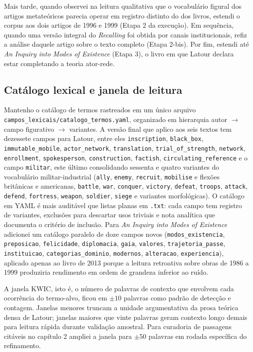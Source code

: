 Mais tarde, quando observei na leitura qualitativa que o vocabulário figural dos artigos metateóricos parecia operar em registro distinto do dos livros, estendi o corpus aos dois artigos de 1996 e 1999 (Etapa 2 da execução). Em sequência, quando uma versão integral do \emph{Recalling} foi obtida por canais institucionais, refiz a análise daquele artigo sobre o texto completo (Etapa 2-bis). Por fim, estendi até \emph{An Inquiry into Modes of Existence} (Etapa 3), o livro em que Latour declara estar completando a teoria ator-rede.

\subsection{Catálogo lexical e janela de leitura}

Mantenho o catálogo de termos rastreados em um único arquivo \texttt{campos\_lexicais/catalogo\_termos.yaml}, organizado em hierarquia autor $\to$ campo figurativo $\to$ variantes. A versão final que aplico aos seis textos tem dezessete campos para Latour, entre eles \texttt{inscription}, \texttt{black\_box}, \texttt{immutable\_mobile}, \texttt{actor\_network}, \texttt{translation}, \texttt{trial\_of\_strength}, \texttt{network}, \texttt{enrollment}, \texttt{spokesperson}, \texttt{construction}, \texttt{factish}, \texttt{circulating\_reference} e o campo \texttt{militar}, este último consolidando sessenta e quatro variantes do vocabulário militar-industrial (\texttt{ally}, \texttt{enemy}, \texttt{recruit}, \texttt{mobilise} e flexões britânicas e americanas, \texttt{battle}, \texttt{war}, \texttt{conquer}, \texttt{victory}, \texttt{defeat}, \texttt{troops}, \texttt{attack}, \texttt{defend}, \texttt{fortress}, \texttt{weapon}, \texttt{soldier}, \texttt{siege} e variantes morfológicas). O catálogo em YAML é mais auditável que listas planas em \texttt{.txt}: cada campo tem registro de variantes, exclusões para descartar usos triviais e nota analítica que documenta o critério de inclusão. Para \emph{An Inquiry into Modes of Existence} adicionei um catálogo paralelo de doze campos novos (\texttt{modos\_existencia}, \texttt{preposicao}, \texttt{felicidade}, \texttt{diplomacia}, \texttt{gaia}, \texttt{valores}, \texttt{trajetoria\_passe}, \texttt{instituicao}, \texttt{categorias\_dominio}, \texttt{modernos}, \texttt{alteracao}, \texttt{experiencia}), aplicado apenas ao livro de 2013 porque a leitura retroativa sobre obras de 1986 a 1999 produziria rendimento em ordem de grandeza inferior ao ruído.

A janela KWIC, isto é, o número de palavras de contexto que envolvem cada ocorrência do termo-alvo, ficou em $\pm 10$ palavras como padrão de detecção e contagem. Janelas menores truncam a unidade argumentativa da prosa teórica densa de Latour; janelas maiores que vinte palavras geram contexto longo demais para leitura rápida durante validação amostral. Para curadoria de passagens citáveis no capítulo 2 ampliei a janela para $\pm 50$ palavras em rodada específica do refinamento.

